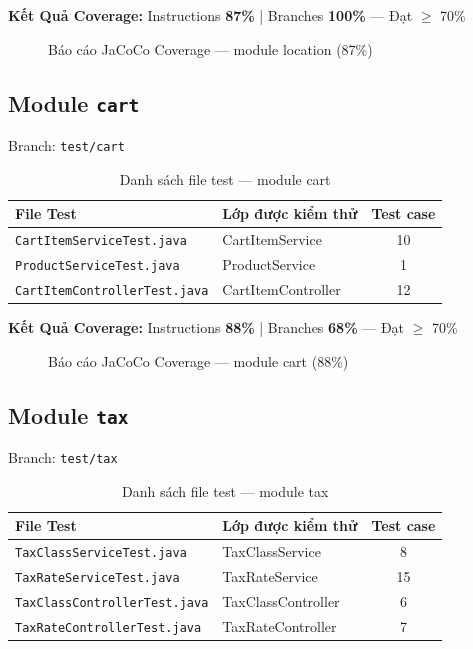 \textbf{Kết Quả Coverage:} Instructions \textbf{87\%} | Branches \textbf{100\%} --- Đạt $\geq$ 70\%

\begin{figure}[H]
\centering
{}
\caption{Báo cáo JaCoCo Coverage --- module location (87\%)}
\end{figure}

\subsection{Module \texttt{cart}}

Branch: \texttt{test/cart}

\begin{table}[H]
\centering
\caption{Danh sách file test --- module cart}
\begin{tabular}{|l|l|c|}
\hline
\textbf{File Test} & \textbf{Lớp được kiểm thử} & \textbf{Test case} \\
\hline
\texttt{CartItemServiceTest.java} & CartItemService & 10 \\
\hline
\texttt{ProductServiceTest.java} & ProductService & 1 \\
\hline
\texttt{CartItemControllerTest.java} & CartItemController & 12 \\
\hline
\end{tabular}
\end{table}

\textbf{Kết Quả Coverage:} Instructions \textbf{88\%} | Branches \textbf{68\%} --- Đạt $\geq$ 70\%

\begin{figure}[H]
\centering
{}
\caption{Báo cáo JaCoCo Coverage --- module cart (88\%)}
\end{figure}

\subsection{Module \texttt{tax}}

Branch: \texttt{test/tax}

\begin{table}[H]
\centering
\caption{Danh sách file test --- module tax}
\begin{tabular}{|l|l|c|}
\hline
\textbf{File Test} & \textbf{Lớp được kiểm thử} & \textbf{Test case} \\
\hline
\texttt{TaxClassServiceTest.java} & TaxClassService & 8 \\
\hline
\texttt{TaxRateServiceTest.java} & TaxRateService & 15 \\
\hline
\texttt{TaxClassControllerTest.java} & TaxClassController & 6 \\
\hline
\texttt{TaxRateControllerTest.java} & TaxRateController & 7 \\
\hline
\end{tabular}
\end{table}

